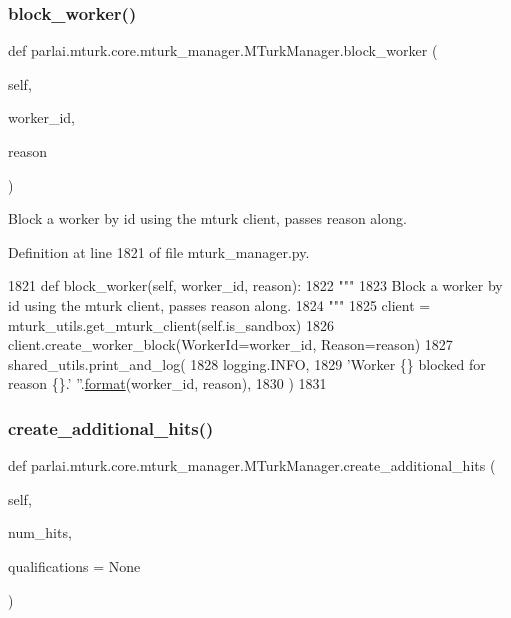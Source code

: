 \subsubsection{\texorpdfstring{block\+\_\+worker()}{block\_worker()}}
{\footnotesize\ttfamily def parlai.\+mturk.\+core.\+mturk\+\_\+manager.\+M\+Turk\+Manager.\+block\+\_\+worker (\begin{DoxyParamCaption}\item[{}]{self,  }\item[{}]{worker\+\_\+id,  }\item[{}]{reason }\end{DoxyParamCaption})}

\begin{DoxyVerb}Block a worker by id using the mturk client, passes reason along.
\end{DoxyVerb}
 

Definition at line 1821 of file mturk\+\_\+manager.\+py.


\begin{DoxyCode}
1821     \textcolor{keyword}{def }block\_worker(self, worker\_id, reason):
1822         \textcolor{stringliteral}{"""}
1823 \textcolor{stringliteral}{        Block a worker by id using the mturk client, passes reason along.}
1824 \textcolor{stringliteral}{        """}
1825         client = mturk\_utils.get\_mturk\_client(self.is\_sandbox)
1826         client.create\_worker\_block(WorkerId=worker\_id, Reason=reason)
1827         shared\_utils.print\_and\_log(
1828             logging.INFO,
1829             \textcolor{stringliteral}{'Worker \{\} blocked for reason \{\}.'} \textcolor{stringliteral}{''}.\hyperlink{namespaceparlai_1_1chat__service_1_1services_1_1messenger_1_1shared__utils_a32e2e2022b824fbaf80c747160b52a76}{format}(worker\_id, reason),
1830         )
1831 
\end{DoxyCode}
\mbox{\label{classparlai_1_1mturk_1_1core_1_1mturk__manager_1_1MTurkManager_ae192d527cf9dcf694d8111fb283aa5d7}} 
\subsubsection{\texorpdfstring{create\+\_\+additional\+\_\+hits()}{create\_additional\_hits()}}
{\footnotesize\ttfamily def parlai.\+mturk.\+core.\+mturk\+\_\+manager.\+M\+Turk\+Manager.\+create\+\_\+additional\+\_\+hits (\begin{DoxyParamCaption}\item[{}]{self,  }\item[{}]{num\+\_\+hits,  }\item[{}]{qualifications = {\ttfamily None} }\end{DoxyParamCaption})}

